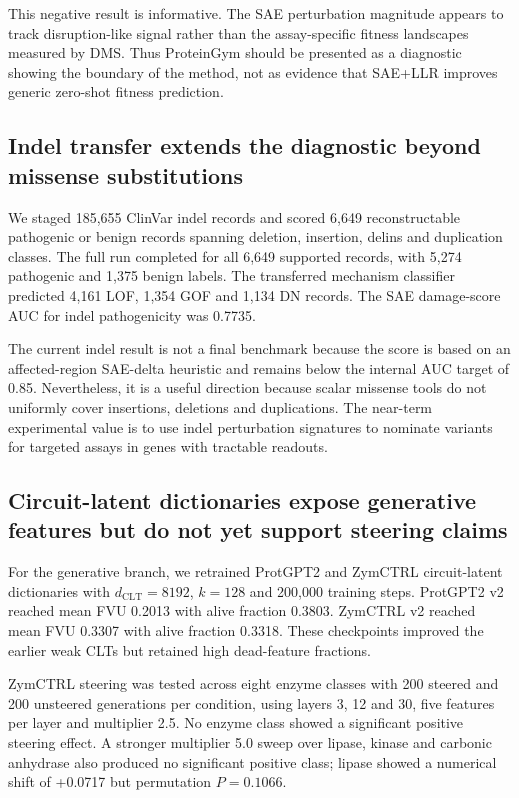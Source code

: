 \documentclass[pdflatex,sn-nature]{sn-jnl}
\begin{document}
This negative result is informative. The SAE perturbation magnitude appears to track disruption-like signal rather than the assay-specific fitness landscapes measured by DMS. Thus ProteinGym should be presented as a diagnostic showing the boundary of the method, not as evidence that SAE+LLR improves generic zero-shot fitness prediction.

\subsection{Indel transfer extends the diagnostic beyond missense substitutions}

We staged 185,655 ClinVar indel records and scored 6,649 reconstructable pathogenic or benign records spanning deletion, insertion, delins and duplication classes. The full run completed for all 6,649 supported records, with 5,274 pathogenic and 1,375 benign labels. The transferred mechanism classifier predicted 4,161 LOF, 1,354 GOF and 1,134 DN records. The SAE damage-score AUC for indel pathogenicity was 0.7735.

The current indel result is not a final benchmark because the score is based on an affected-region SAE-delta heuristic and remains below the internal AUC target of 0.85. Nevertheless, it is a useful direction because scalar missense tools do not uniformly cover insertions, deletions and duplications. The near-term experimental value is to use indel perturbation signatures to nominate variants for targeted assays in genes with tractable readouts.

\subsection{Circuit-latent dictionaries expose generative features but do not yet support steering claims}

For the generative branch, we retrained ProtGPT2 and ZymCTRL circuit-latent dictionaries with $d_\mathrm{CLT}=8192$, $k=128$ and 200,000 training steps. ProtGPT2 v2 reached mean FVU 0.2013 with alive fraction 0.3803. ZymCTRL v2 reached mean FVU 0.3307 with alive fraction 0.3318. These checkpoints improved the earlier weak CLTs but retained high dead-feature fractions.

ZymCTRL steering was tested across eight enzyme classes with 200 steered and 200 unsteered generations per condition, using layers 3, 12 and 30, five features per layer and multiplier 2.5. No enzyme class showed a significant positive steering effect. A stronger multiplier 5.0 sweep over lipase, kinase and carbonic anhydrase also produced no significant positive class; lipase showed a numerical shift of +0.0717 but permutation $P=0.1066$.
\end{document}
